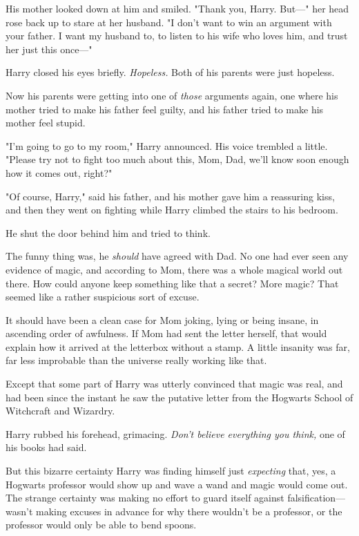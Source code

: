 His mother looked down at him and smiled. "Thank you, Harry. But\mbox{---}" her head
rose back up to stare at her husband. "I don't want to win an argument with
your father. I want my husband to, to listen to his wife who loves him, and
trust her just this once\mbox{---}"

Harry closed his eyes briefly. \emph{Hopeless.} Both of his parents were just
hopeless.

Now his parents were getting into one of \emph{those} arguments again, one
where his mother tried to make his father feel guilty, and his father tried to
make his mother feel stupid.

"I'm going to go to my room," Harry announced. His voice trembled a little.
"Please try not to fight too much about this, Mom, Dad, we'll know soon enough
how it comes out, right?"

"Of course, Harry," said his father, and his mother gave him a reassuring kiss,
and then they went on fighting while Harry climbed the stairs to his bedroom.

He shut the door behind him and tried to think.

The funny thing was, he \emph{should} have agreed with Dad. No one had ever
seen any evidence of magic, and according to Mom, there was a whole magical
world out there. How could anyone keep something like that a secret? More
magic? That seemed like a rather suspicious sort of excuse.

It should have been a clean case for Mom joking, lying or being insane, in
ascending order of awfulness. If Mom had sent the letter herself, that would
explain how it arrived at the letterbox without a stamp. A little insanity was
far, far less improbable than the universe really working like that.

Except that some part of Harry was utterly convinced that magic was real, and
had been since the instant he saw the putative letter from the Hogwarts School
of Witchcraft and Wizardry.

Harry rubbed his forehead, grimacing. \emph{Don't believe everything you
think,} one of his books had said.

But this bizarre certainty{\el} Harry was finding himself just
\emph{expecting} that, yes, a Hogwarts professor would show up and wave a wand
and magic would come out. The strange certainty was making no effort to guard
itself against falsification---wasn't making excuses in advance for why there
wouldn't be a professor, or the professor would only be able to bend spoons.

